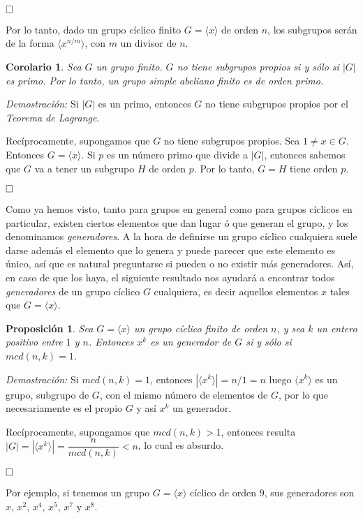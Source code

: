 \documentclass[12pt]{article}
\newtheorem{proposition}[theorem]{Proposición}
\newtheorem{corolario}{Corolario}[theorem]
\begin{document}
$\hfill \square$

Por lo tanto, dado un grupo cíclico finito $G = \langle x \rangle$ de orden $n$, los subgrupos serán de la forma $\langle x^{n/m} \rangle$, con $m$ un divisor de $n$.

\begin{corolario}\label{eq:corpgrupo} Sea $G$ un grupo finito. $G$ no tiene subgrupos propios si y sólo si $|G|$ es primo. Por lo tanto, un grupo simple abeliano finito es de orden primo.
\end{corolario}
\emph{Demostración: }
Si $|G|$ es un primo, entonces $G$ no tiene subgrupos propios por el \textit{Teorema de Lagrange}.

Recíprocamente, supongamos que $G$ no tiene subgrupos propios. Sea $1 \neq x \in G$. Entonces $G = \langle x \rangle.$ Si $p$ es un número primo que divide a $|G|$, entonces sabemos que $G$ va a tener un subgrupo $H$ de orden $p$. Por lo tanto, $G = H$ tiene orden $p$.

$\hfill \square$

Como ya hemos visto, tanto para grupos en general como para grupos cíclicos en particular, existen ciertos elementos que dan lugar ó que generan el grupo, y los denominamos \textit{generadores}. A la hora de definirse un grupo cíclico cualquiera suele darse además el elemento que lo genera y puede parecer que este elemento es único, así que es natural preguntarse si pueden o no existir más generadores. Así, en caso de que los haya, el siguiente resultado nos ayudará a encontrar todos \textit{generadores} de un grupo cíclico $G$ cualquiera, es decir aquellos elementos $x$ tales que $G = \langle x \rangle$.

\begin{proposition}Sea $G = \langle x \rangle$ un grupo cíclico finito de orden $n$, y sea $k$ un entero positivo entre $1$ y $n$. Entonces $x^{k}$ es un generador de $G$ si y sólo si $mcd(n,k) = 1$.
\end{proposition}
\emph{Demostración: }
Si $mcd(n,k) = 1$, entonces $| \langle x^{k} \rangle | = n/1 = n$ luego $\langle x^{k} \rangle$ es un grupo, subgrupo de $G$, con el mismo número de elementos de $G$, por lo que necesariamente es el propio $G$ y así $x^{k}$ un generador.

Recíprocamente, supongamos que $mcd(n,k)> 1$, entonces resulta $|G| = | \langle x^{k} \rangle | = \dfrac{n}{mcd(n,k)} < n$, lo cual es absurdo.

$\hfill \square$

Por ejemplo, si tenemos un grupo $G = \langle x \rangle$  cíclico de orden $9$, sus generadores son $x$, $x^{2}$, $x^{4}$, $x^{5}$, $x^{7}$ y $x^{8}$.
\end{document}
